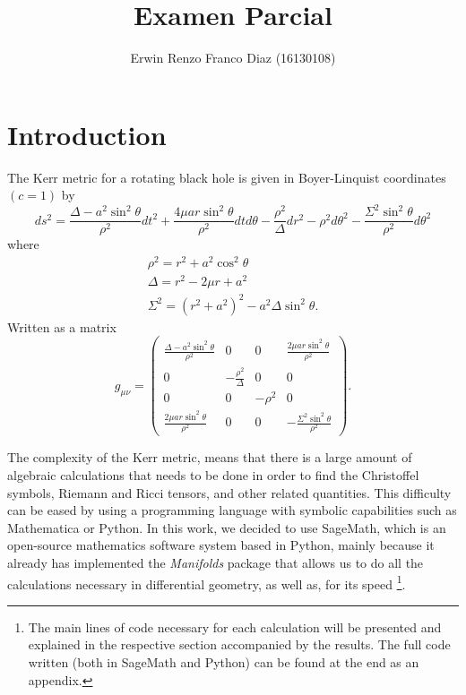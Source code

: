 \documentclass[11pt,a4paper]{article}
\author{Erwin Renzo Franco Diaz (16130108)}
\title{Examen Parcial}
\date{}
\begin{document}
\maketitle
\section{Introduction}

The Kerr metric for a rotating black hole is given in Boyer-Linquist coordinates $(c = 1)$ by
\begin{equation}
	ds^2 = \frac{\Delta - a^2\sin^2{\theta}}{\rho^2}dt^2 
	+ \frac{4\mu ar\sin^2{\theta}}{\rho^2}dt d\theta
	- \frac{\rho^2}{\Delta}dr^2 
	- \rho^2 d\theta^2
	- \frac{\Sigma^2 \sin^2{\theta}}{\rho^2}d\theta^2
\end{equation}
where
\begin{gather}
	\rho^2 = r^2 + a^2\cos^2\theta \\
	\Delta = r^2 - 2\mu r + a^2 \\
	\Sigma^2 = (r^2 + a^2)^2 - a^2\Delta \sin^2\theta.
\end{gather}
Written as a matrix
\begin{equation}\label{bl_metric}
g_{\mu \nu} = 
\begin{pmatrix}
\frac{\Delta - a^2\sin^2 \theta}{\rho^2} & 0 & 0 & \frac{2\mu ar\sin^2 \theta}{\rho^2} \\
0 & -\frac{\rho^2}{\Delta} & 0 & 0 \\
0 & 0 & -\rho^2 & 0 \\
 \frac{2\mu ar\sin^2 \theta}{\rho^2} & 0 & 0 & -\frac{\Sigma^2 \sin^2 \theta}{\rho^2}
\end{pmatrix}.
\end{equation}

The complexity of the Kerr metric, means that there is a large amount of algebraic calculations that needs to be done in order to find the Christoffel symbols, Riemann and Ricci tensors, and other related quantities. This difficulty can be eased by using a programming language with symbolic capabilities such as Mathematica or Python. In this work, we decided to use SageMath, which is an open-source mathematics software system based in Python, mainly because it already has  implemented the \emph{Manifolds} package that allows us to do all the calculations necessary in differential geometry, as well as, for its speed \footnote{The main lines of code necessary for each calculation will be presented and explained in the respective section accompanied by the results. The full code written (both in SageMath and Python) can be found at the end as an appendix.}. 
\end{document}

